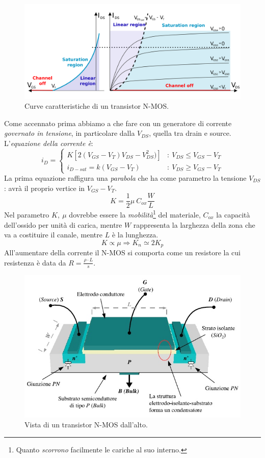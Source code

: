 \documentclass[
]{book}
\begin{document}
\begin{figure}
\centering
\includegraphics[width=0.65\linewidth,height=\textheight,keepaspectratio]{assets/imgs/caratteristiche_NMOS.png}
\caption{Curve caratteristiche di un transistor N-MOS.}
\end{figure}

Come accennato prima abbiamo a che fare con un generatore di corrente
\emph{governato in tensione}, in particolare dalla \(V_{DS}\), quella
tra drain e source. L'\emph{equazione della corrente è}: \[
i_{D}= \left\{ \begin{array}{cl}
K[2(V_{GS}-V_{T})V_{DS}-V^{2}_{DS})] & : \ V_{DS} \leq V_{GS} - V_{T} \\
i_{D-sat}=k(V_{GS}-V_{T}) & : \ V_{DS} \geq V_{GS} - V_{T}
\end{array} \right.
\] La prima equazione raffigura una \emph{parabola} che ha come
parametro la tensione \(V_{DS}\): avrà il proprio vertice in
\(V_{GS}-V_{T}\). \[
K=\frac{1}{2}\mu\:C_{ox}\frac{W}{L}
\] Nel parametro \(K,\:\mu\) dovrebbe essere la
\emph{mobilità}\footnote{Quanto \emph{scorrono} facilmente le cariche al
  suo interno.} del materiale, \(C_{ox}\) la capacità dell'ossido per
unità di carica, mentre \(W\) rappresenta la larghezza della zona che va
a costituire il canale, mentre \(L\) è la lunghezza. \[
K\propto \mu \Rightarrow K_{n}\simeq 2K_{p}
\] All'aumentare della corrente il N-MOS si comporta come un resistore
la cui resistenza è data da \(R=\frac{\rho\cdot L}{s}\).

\begin{figure}
\centering
\includegraphics[width=0.5\linewidth,height=\textheight,keepaspectratio]{assets/imgs/nmos_dall_alto.png}
\caption{Vista di un transistor N-MOS dall'alto.}
\end{figure}
\end{document}
